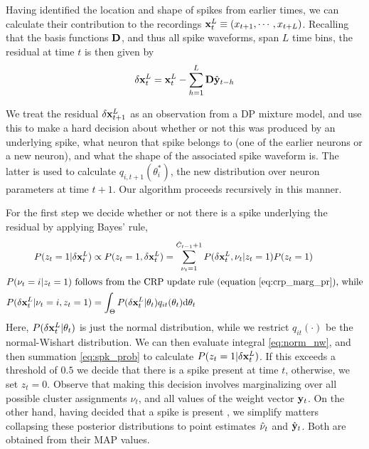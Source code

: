 Having identified the location and shape of spikes from earlier times, we can calculate their contribution to the recordings 
$\mathbf{x}^L_t \equiv (x_{t+1},\cdots, x_{t+L})$.
Recalling that the basis functions $\mathbf{D}$, and thus all spike waveforms, span $L$ time bins, the residual at time $t$ is then given by
\begin{align}
  \delta{\mathbf{x}}^L_t = \mathbf{x}^L_t - \sum_{h=1}^L \mathbf{D}\hat{\mathbf{y}}_{t-h} \label{eq:resid}
\end{align}

We treat the residual $\delta{\mathbf{x}}^L_{t+1}$ as an observation from a DP mixture model, and use this to make a hard decision about whether or not this was produced 
by an underlying spike, what neuron that spike belongs 
to (one of the earlier neurons or a new neuron), and what the shape of the associated spike waveform is. The latter is used to calculate
$q_{i,t+1}(\theta^*_i)$, the new distribution over neuron parameters at time $t+1$. Our algorithm proceeds recursively in this manner. 


For the first step we decide whether or not there is a spike underlying the residual by applying Bayes' rule,
\begin{align}
  P(z_t = 1 | \delta{\mathbf{x}}^L_t)  &\propto P(z_t = 1,  \delta{\mathbf{x}}^L_t) = \sum_{\nu_t = 1}^{\hat{C}_{t-1}+1} P(\delta{\mathbf{x}}^L_t, {\nu_t} | z_t = 1) P(z_t = 1) \label{eq:spk_prob}\\
\intertext{$P({\nu_t} = i | z_t = 1)$ follows from the CRP update rule (equation \eqref{eq:crp_marg_pr}), while}
  P(\delta{\mathbf{x}}^L_t | {\nu_t = i} , z_t = 1) &= \int_{\Theta} P(\delta{\mathbf{x}}^L_t | \theta_t) q_{it} (\theta_t) \mathrm{d} \theta_t  \label{eq:norm_nw}
\end{align}
Here,  $P(\delta{\mathbf{x}}^L_t | \theta_t)$ is just the normal distribution, while we restrict $q_{it}(\cdot)$ be the 
normal-Wishart distribution. %
We can then evaluate integral \eqref{eq:norm_nw}, and then summation \eqref{eq:spk_prob} to calculate $P(z_t = 1 | \delta{\mathbf{x}}^L_t)$. 
If this exceeds a threshold of $0.5$ we decide that there is a spike present at time $t$, otherwise, we set $z_t = 0$.
Observe that making this decision involves marginalizing over all possible cluster assignments $\nu_t$, and all values of the weight vector $\mathbf{y}_t$.
On the other hand, having decided that a spike is present , we simplify matters collapsing these posterior distributions to point estimates 
$\hat{\nu}_t$ and $\hat{\mathbf{y}}_t$. Both are obtained from their MAP values. 

